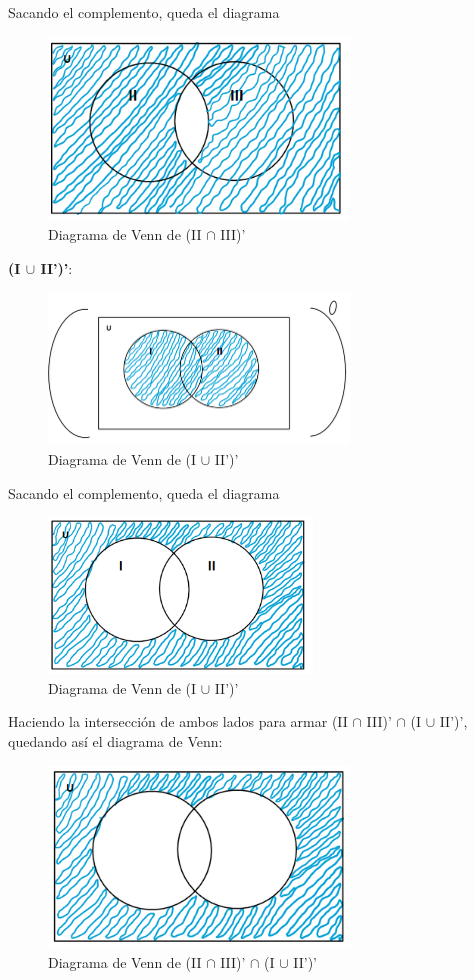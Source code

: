 \newpage

Sacando el complemento, queda el diagrama

\begin{figure}[htbp]
\centering
\includegraphics[width=8cm]{d/aaa.png}
\caption[]{Diagrama de Venn de (II $\cap$ III)'}
\end{figure} 

\textbf{(I $\cup$ II')'}:

\begin{figure}[htbp]
\centering
\includegraphics[width=8cm]{d/bb.png}
\caption[]{Diagrama de Venn de (I $\cup$ II')'}
\end{figure} 

Sacando el complemento, queda el diagrama

\begin{figure}[htbp]
\centering
\includegraphics[width=7cm]{d/bbb.png}
\caption[]{Diagrama de Venn de (I $\cup$ II')'}
\end{figure} 

\newpage

Haciendo la intersección de ambos lados para armar (II $\cap$ III)' $\cap$ (I $\cup$ II')', quedando así el diagrama de Venn:

\begin{figure}[htbp]
\centering
\includegraphics[width=8cm]{d/aabb.png}
\caption[]{Diagrama de Venn de (II $\cap$ III)' $\cap$ (I $\cup$ II')'}
\end{figure} 
